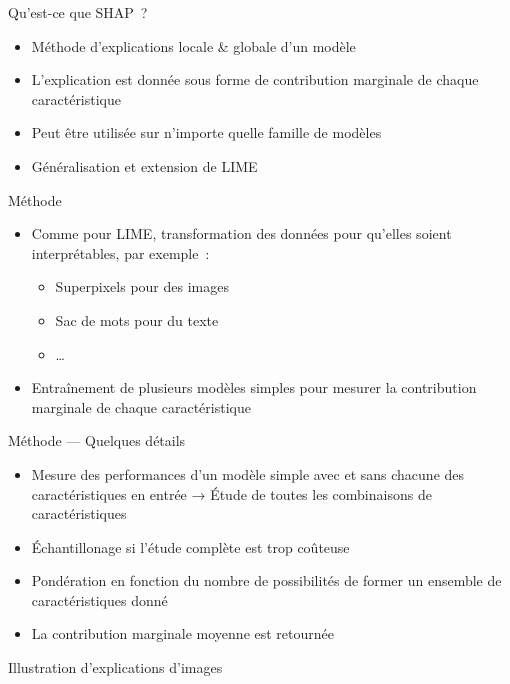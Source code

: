 \begin{frame}{Qu'est-ce que SHAP~?}
  \begin{itemize}
    \item Méthode d'explications locale \& globale d'un modèle
    \item L'explication est donnée sous forme de contribution marginale de chaque caractéristique
    \item Peut être utilisée sur n'importe quelle famille de modèles
    \item Généralisation et extension de LIME
  \end{itemize}
\end{frame}

\begin{frame}{Méthode}
  \begin{itemize}
    \item Comme pour LIME, transformation des données pour qu'elles soient interprétables, par exemple~:
      \begin{itemize}
        \item Superpixels pour des images
        \item Sac de mots pour du texte
        \item …
      \end{itemize}
    \item Entraînement de plusieurs modèles simples pour mesurer la contribution marginale de chaque caractéristique
  \end{itemize}
\end{frame}

\begin{frame}{Méthode — Quelques détails}
  \begin{itemize}
    \item Mesure des performances d'un modèle simple avec et sans chacune des caractéristiques en entrée → Étude de toutes les combinaisons de caractéristiques
    \item Échantillonage si l'étude complète est trop coûteuse
    \item Pondération en fonction du nombre de possibilités de former un ensemble de caractéristiques donné
    \item La contribution marginale moyenne est retournée
  \end{itemize}
\end{frame}

\begin{frame}{Illustration d'explications d'images}
\end{frame}

